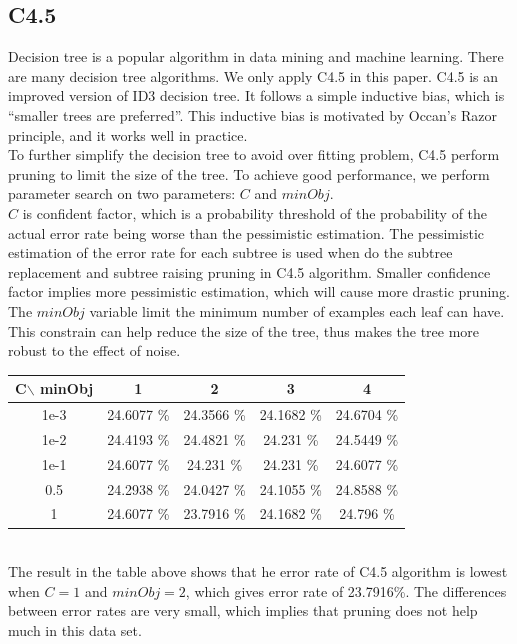 \documentclass[a4paper,11pt]{article}
\begin{document}
\subsection{C4.5}
Decision tree is a popular algorithm in data mining and machine learning. There are many decision tree algorithms. We only apply C4.5 in this paper. C4.5 is an improved version of ID3 decision tree. It follows a simple inductive bias, which is ``smaller trees are preferred''. This inductive bias is motivated by Occan's Razor principle, and it works well in practice.\\
To further simplify the decision tree to avoid over fitting problem, C4.5 perform pruning to limit the size of the tree. To achieve good performance, we perform parameter search on two parameters: $C$ and $minObj$. \\
$C$ is confident factor, which is a probability threshold of the probability of the actual error rate being worse than the pessimistic estimation\cite{Morgan.Kaufmann}. The pessimistic estimation of the error rate for each subtree is used when do the subtree replacement and subtree raising pruning in C4.5 algorithm. Smaller confidence factor implies more pessimistic estimation, which will cause more drastic pruning.\\
The $minObj$ variable limit the minimum number of examples each leaf can have. This constrain can help reduce the size of the tree, thus makes the tree more robust to the effect of noise.
\vspace{0.5cm}\\
\begin{tabular}{c|c c c c}
C$\backslash$ minObj	&1		&2		&3		&4\\
\hline \hline
1e-3 	&24.6077 \%	&24.3566 \%	&24.1682 \%	 &24.6704 \%\\
1e-2	&24.4193 \%	 &24.4821 \%	&24.231  \%	 &24.5449 \%\\
1e-1	&24.6077 \%	&24.231  \%	&24.231  \%	 &24.6077 \%\\
0.5 &24.2938 \%     &24.0427 \% &24.1055 \%  &24.8588 \%\\
1	&24.6077 \%	    &23.7916 \%	&24.1682 \%	 &24.796  \%\\
\end{tabular}
\vspace{0.5cm}\\
The result in the table above shows that he error rate of C4.5 algorithm is lowest when $C=1$ and $minObj=2$, which gives error rate of 23.7916\%. The differences between error rates are very small, which implies that pruning does not help much in this data set.\\
\end{document}
